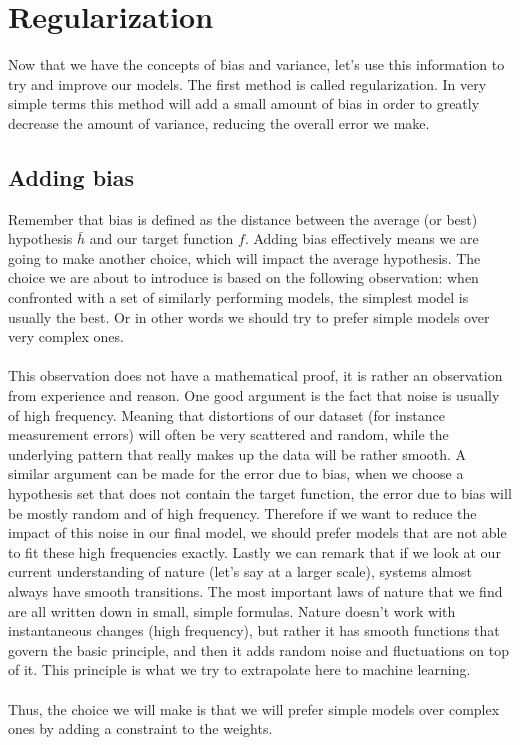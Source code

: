 \section{Regularization}
\label{sec:glm-regularization}
Now that we have the concepts of bias and variance, let's use this information to try and improve our models. The first method is called regularization\cite{caltechmachinelearning}\cite{zou2005regularization}\cite{friedman2010regularization}. In very simple terms this method will add a small amount of bias in order to greatly decrease the amount of variance, reducing the overall error we make.
\subsection{Adding bias}
Remember that bias is defined as the distance between the average (or best) hypothesis $\bar{h}$ and our target function $f$. Adding bias effectively means we are going to make another choice, which will impact the average hypothesis. The choice we are about to introduce is based on the following observation: when confronted with a set of similarly performing models, the simplest model is usually the best. Or in other words we should try to prefer simple models over very complex ones. \\ \\
This observation does not have a mathematical proof, it is rather an observation from experience and reason. One good argument is the fact that noise is usually of high frequency. Meaning that distortions of our dataset (for instance measurement errors) will often be very scattered and random, while the underlying pattern that really makes up the data will be rather smooth. A similar argument can be made for the error due to bias, when we choose a hypothesis set that does not contain the target function, the error due to bias will be mostly random and of high frequency. Therefore if we want to reduce the impact of this noise in our final model, we should prefer models that are not able to fit these high frequencies exactly. Lastly we can remark that if we look at our current understanding of nature (let's say at a larger scale), systems almost always have smooth transitions. The most important laws of nature that we find are all written down in small, simple formulas. Nature doesn't work with instantaneous changes (high frequency), but rather it has smooth functions that govern the basic principle, and then it adds random noise and fluctuations on top of it. This principle is what we try to extrapolate here to machine learning.\\\\
Thus, the choice we will make is that we will prefer simple models over complex ones by adding a constraint to the weights.
